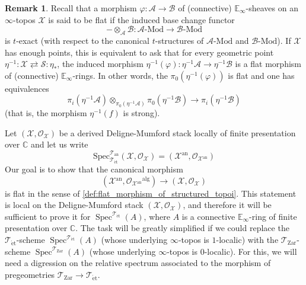 \documentclass[12pt,a4paper,reqno]{amsart}
\theoremstyle{plain}
\theoremstyle{definition}
\newtheorem{rem}[thm]{Remark}
\theoremstyle{remark}
\numberwithin{equation}{section}
\begin{document}
\begin{rem}
	Recall that a morphism $\varphi \colon {\mathcal A} \to {\mathcal B}$ of (connective) $\mathbb E_\infty$-sheaves on an $\infty$-topos ${\mathcal X}$ is said to be flat if the induced base change functor
	\[ - \otimes_{\mathcal A} {\mathcal B} \colon {\mathcal A} \textrm{-} {\mathrm{Mod}} \to {\mathcal B} \textrm{-} {\mathrm{Mod}} \]
	is $t$-exact (with respect to the canonical $t$-structures of ${\mathcal A} \textrm{-} {\mathrm{Mod}}$ and ${\mathcal B} \textrm{-} {\mathrm{Mod}}$).
	If ${\mathcal X}$ has enough points, this is equivalent to ask that for every geometric point $\eta{^{-1}} \colon {\mathcal X} \rightleftarrows {\mathcal S} \colon \eta_*$, the induced morphism $\eta{^{-1}}(\varphi) \colon \eta{^{-1}} {\mathcal A} \to \eta{^{-1}} {\mathcal B}$ is a flat morphism of (connective) $\mathbb E_\infty$-rings.
	In other words, the $\pi_0(\eta{^{-1}}(\varphi))$ is flat and one has equivalences
	\[ \pi_i(\eta{^{-1}} {\mathcal A}) \otimes_{\pi_0 (\eta{^{-1}} {\mathcal A})} \pi_0 (\eta{^{-1}} {\mathcal B}) \to \pi_i (\eta{^{-1}} {\mathcal B}) \]
	(that is, the morphism $\eta{^{-1}}(f)$ is strong).
\end{rem}

Let $({\mathcal X}, {\mathcal O}_{\mathcal X})$ be a derived {Deligne-Mumford\xspace} stack locally of finite presentation over $\mathbb C$ and let us write
\[ \mathrm{Spec}^{{\mathcal T}_{\mathrm{an}}}_{{\mathcal T}_{\mathrm{\acute{e}t}}}({\mathcal X}, {\mathcal O}_{\mathcal X}) = ({\mathcal X}{^\mathrm{an}}, {\mathcal O}_{{\mathcal X}{^\mathrm{an}}}) \]
Our goal is to show that the canonical morphism
\[ ({\mathcal X}{^\mathrm{an}}, {\mathcal O}_{{\mathcal X}{^\mathrm{an}}}{^\mathrm{alg}}) \to ({\mathcal X}, {\mathcal O}_{\mathcal X}) \]
is flat in the sense of \cref{def:flat_morphism_of_structured_topoi}.
This statement is local on the {Deligne-Mumford\xspace} stack $({\mathcal X}, {\mathcal O}_{\mathcal X})$, and therefore it will be sufficient to prove it for $\operatorname{Spec}^{{\mathcal T}_{\mathrm{\acute{e}t}}}(A)$, where $A$ is a connective $\mathbb E_\infty$-ring of finite presentation over $\mathbb C$.
The task will be greatly simplified if we could replace the ${{\mathcal T}_{\mathrm{\acute{e}t}}}$-scheme $\operatorname{Spec}^{{\mathcal T}_{\mathrm{\acute{e}t}}}(A)$ (whose underlying $\infty$-topos is $1$-localic) with the ${{\mathcal T}_{\mathrm{Zar}}}$-scheme $\operatorname{Spec}^{{\mathcal T}_{\mathrm{Zar}}}(A)$ (whose underlying $\infty$-topos is $0$-localic).
For this, we will need a digression on the relative spectrum associated to the morphism of pregeometries ${{\mathcal T}_{\mathrm{Zar}}} \to {{\mathcal T}_{\mathrm{\acute{e}t}}}$.
\end{document}
